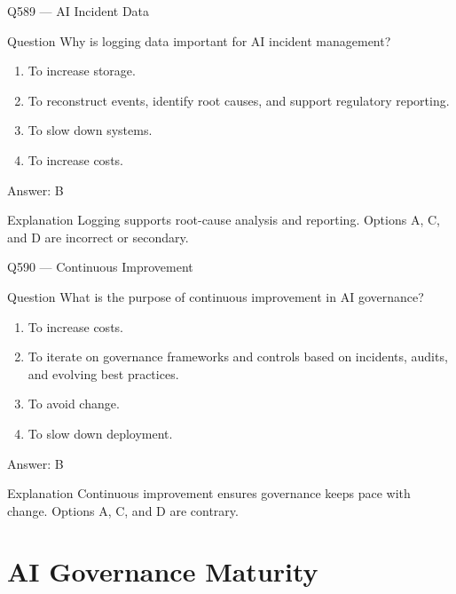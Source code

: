 \documentclass[aspectratio=169,8pt]{beamer}
\begin{document}
	\begin{frame}{Q589 --- AI Incident Data}
		\begin{block}{Question}
			Why is logging data important for AI incident management?
			\begin{enumerate}
				\item To increase storage.
				\item To reconstruct events, identify root causes, and support regulatory reporting.
				\item To slow down systems.
				\item To increase costs.
			\end{enumerate}
		\end{block}
		\begin{exampleblock}{Answer: B}\end{exampleblock}
		\begin{block}{Explanation}
			Logging supports root-cause analysis and reporting. Options A, C, and D are incorrect or secondary.
		\end{block}
	\end{frame}
	
	\begin{frame}{Q590 --- Continuous Improvement}
		\begin{block}{Question}
			What is the purpose of continuous improvement in AI governance?
			\begin{enumerate}
				\item To increase costs.
				\item To iterate on governance frameworks and controls based on incidents, audits, and evolving best practices.
				\item To avoid change.
				\item To slow down deployment.
			\end{enumerate}
		\end{block}
		\begin{exampleblock}{Answer: B}\end{exampleblock}
		\begin{block}{Explanation}
			Continuous improvement ensures governance keeps pace with change. Options A, C, and D are contrary.
		\end{block}
	\end{frame}
	
	\section{AI Governance Maturity}
	
\end{document}
